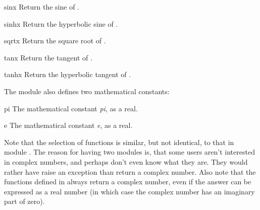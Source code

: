 \begin{funcdesc}{sin}{x}
Return the sine of .
\end{funcdesc}

\begin{funcdesc}{sinh}{x}
Return the hyperbolic sine of .
\end{funcdesc}

\begin{funcdesc}{sqrt}{x}
Return the square root of .
\end{funcdesc}

\begin{funcdesc}{tan}{x}
Return the tangent of .
\end{funcdesc}

\begin{funcdesc}{tanh}{x}
Return the hyperbolic tangent of .
\end{funcdesc}

The module also defines two mathematical constants:

\begin{datadesc}{pi}
The mathematical constant \emph{pi}, as a real.
\end{datadesc}

\begin{datadesc}{e}
The mathematical constant \emph{e}, as a real.
\end{datadesc}

Note that the selection of functions is similar, but not identical, to
that in module .  The reason for having
two modules is, that some users aren't interested in complex numbers,
and perhaps don't even know what they are.  They would rather have
 raise an exception than return a complex number.
Also note that the functions defined in  always return a
complex number, even if the answer can be expressed as a real number
(in which case the complex number has an imaginary part of zero).
